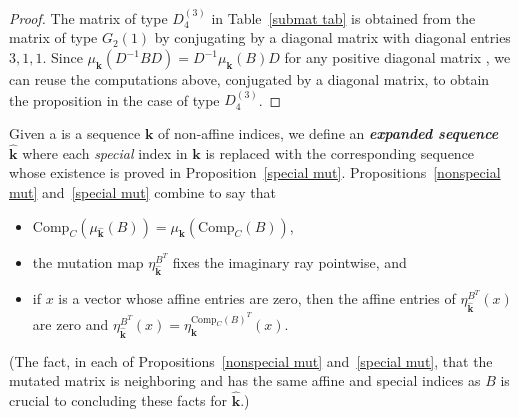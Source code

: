 \documentclass{amsart}
\theoremstyle{definition}
\theoremstyle{remark}
\numberwithin{equation}{section}
\newcommand{\newword}[1]{\textbf{\emph{#1}}}
\newcommand{\reals}{\mathbb R}
\newcommand{\0}{{\mathbf{0}}}
\newcommand{\Comp}{\mathrm{Comp}_C}
\newcommand{\kk}{{\boldsymbol{k}}}
\begin{document}
\begin{proof}
The matrix of type $D_4^{(3)}$ in Table~\ref{submat tab} is obtained from the matrix of type $G_2{(1)}$ by conjugating by a diagonal matrix with diagonal entries $3,1,1$.
Since $\mu_\kk(D^{-1}BD)=D^{-1}\mu_\kk(B)D$ for any positive diagonal matrix \cite[Proposition~4.5]{ca1}, we can reuse the computations above, conjugated by a diagonal matrix, to obtain the proposition in the case of type $D_4^{(3)}$.
\end{proof}

Given a  is a sequence $\kk$ of non-affine indices, we define an \newword{expanded sequence}~$\widehat\kk$ 
where each \emph{special} index in $\kk$ is replaced with the corresponding sequence whose existence is proved in Proposition~\ref{special mut}.
Propositions~\ref{nonspecial mut} and~\ref{special mut} combine to say that 
\begin{itemize}
\item
$\Comp(\mu_{\widehat\kk}(B))=\mu_\kk(\Comp(B))$,
\item
the mutation map $\eta^{B^T}_{\widehat\kk}$ fixes the imaginary ray pointwise, and 
\item
if $x$ is a vector whose affine entries are zero, then the affine entries of $\eta^{B^T}_{\widehat\kk}(x)$ are zero and $\eta^{B^T}_{\widehat\kk}(x)=\eta^{\Comp(B)^T}_\kk(x)$.
\end{itemize}
(The fact, in each of Propositions~\ref{nonspecial mut} and~\ref{special mut}, that the mutated matrix is neighboring and has the same affine and special indices as $B$ is crucial to concluding these facts for $\widehat\kk$.)
\end{document}
